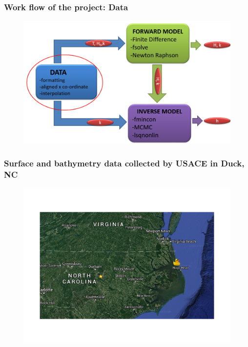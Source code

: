 \documentclass[7pt]{beamer}
\begin{document}
\begin{frame}
    \frametitle{Work flow of the project: Data }
        \begin{figure}[flowchart]
        \includegraphics[width=1.0\linewidth]{img/Focus_D.png}
        \end{figure}
\end{frame}

\begin{frame}
	\frametitle{Surface and bathymetry data collected by USACE in Duck, NC}
		 \centering
		 \begin{figure}
       			 \includegraphics[width=1\linewidth]{img/map_ncsu_duck.png}
       		 \end{figure}
\end{frame}
\end{document}
